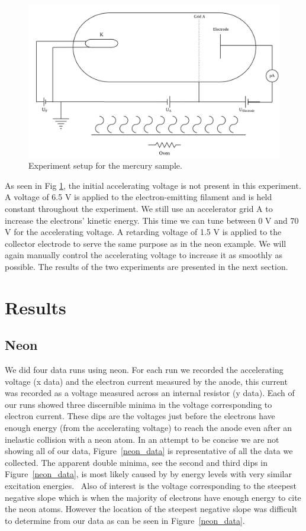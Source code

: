 \documentclass[prb,preprint]{revtex4-1}
\begin{document}
\begin{figure}
    \centering
    \includegraphics[width=\textwidth]{fighg.png}
    \caption{Experiment setup for the mercury sample.}
    \label{fighg}
    \end{figure}

As seen in Fig \ref{fighg}, the initial accelerating voltage is not present in this experiment. A voltage of 6.5 V is applied to the electron-emitting filament and is held constant throughout the experiment. We still use an accelerator grid A to increase the electrons' kinetic energy. This time we can tune between 0 V and 70 V for the accelerating voltage. A retarding voltage of 1.5 V is applied to the collector electrode to serve the same purpose as in the neon example. We will again manually control the accelerating voltage to increase it as smoothly as possible. The results of the two experiments are presented in the next section.


\section{Results}

\subsection{Neon}

We did four data runs using neon. For each run we recorded the accelerating voltage (x data) and the electron current measured by the anode, this current was recorded as a voltage measured across an internal resistor (y data). Each of our runs showed three discernible minima in the voltage corresponding to electron current. These dips are the voltages just before the electrons have enough energy (from the accelerating voltage) to reach the anode even after an inelastic collision with a neon atom. In an attempt to be concise we are not showing all of our data, Figure~\ref{neon_data} is representative of all the data we collected. The apparent double minima, see the second and third dips in Figure~\ref{neon_data}, is most likely caused by by energy levels with very similar excitation energies.~\cite{newfeatures} Also of interest is the voltage corresponding to the steepest negative slope which is when the majority of electrons have enough energy to cite the neon atoms. However the location of the steepest negative slope was difficult to determine from our data as can be seen in Figure~\ref{neon_data}.
\end{document}
